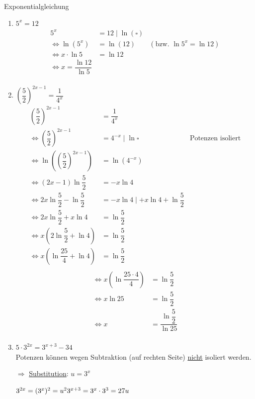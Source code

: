 \clearpage
\Bsps Exponentialgleichung
\begin{enumerate}
	\item $5^x=12$
	\begin{align*}
	5^x&=12\mid \ln(\square)\\
	\Leftrightarrow \ln(5^x) &= \ln(12) &(\text{bzw. }\ln5^x = \ln12)\\
	\Leftrightarrow x\cdot\ln5 &= \ln12\\
	\Leftrightarrow x = \dfrac{\ln12}{\ln5}\\
	\end{align*}
	
	\item $\left(\dfrac{5}{2}\right)^{2x-1} = \dfrac{1}{4^x}$
	\begin{align*}
	\left(\dfrac{5}{2}\right)^{2x-1} &= \dfrac{1}{4^x}\\
	\Leftrightarrow \left(\dfrac{5}{2}\right)^{2x-1} &= 4^{-x}\mid\ln\square &\text{Potenzen isoliert}\\
	\Leftrightarrow \ln\left(\left(\dfrac{5}{2}\right)^{2x-1}\right) &= \ln\left(4^{-x}\right)\\
	\Leftrightarrow (2x-1)\ln\dfrac{5}{2} &= -x\ln4\\
	\Leftrightarrow 2x\ln\dfrac{5}{2}-\ln\dfrac{5}{2} &= -x\ln4\mid +x\ln4+\ln\dfrac{5}{2}\\
	\Leftrightarrow 2x\ln\dfrac{5}{2}+x\ln4 &= \ln\dfrac{5}{2}\\
	\Leftrightarrow x\left(2\ln\dfrac{5}{2}+\ln4\right) &= \ln\dfrac{5}{2}\\
	\Leftrightarrow x\left(\ln\dfrac{25}{4}+\ln4\right) &= \ln\dfrac{5}{2}\\
	\end{align*}
	\begin{align*}
	\Leftrightarrow x\left(\ln\dfrac{25\cdot 4}{4}\right) &= \ln\dfrac{5}{2}\\
	\Leftrightarrow x\ln25 &= \ln\dfrac{5}{2}\\
	\Leftrightarrow x &= \dfrac{\ln\dfrac{5}{2}}{\ln25}\\
	\end{align*}
	
	\item $5\cdot 3^{2x}=3^{x+3}-34$\\
	Potenzen können wegen Subtraktion (auf rechten Seite) \ul{nicht} isoliert werden.
	
	$\Rightarrow$ \ul{Substitution}: $u=3^x$
	
	$3^{2x}=(3^x)^2 = u^2\\
	3^{x+3} = 3^x\cdot3^3 = 27u$
	

\end{enumerate}
